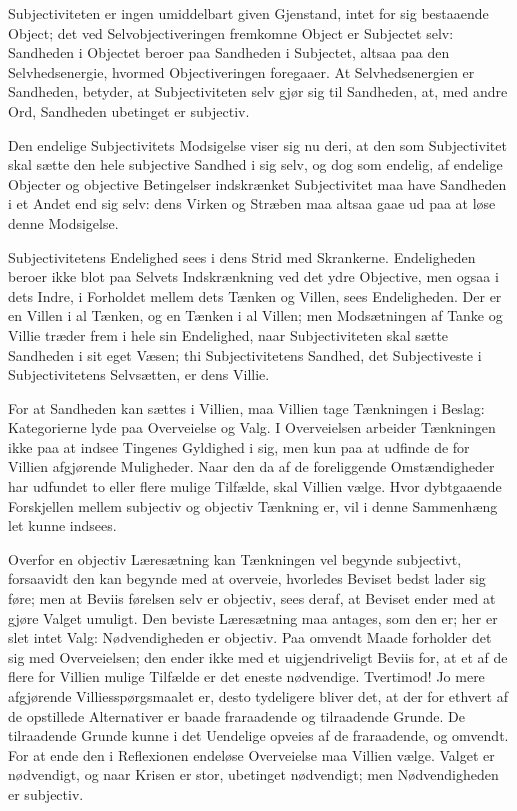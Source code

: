 \documentclass[12pt]{book}
\newcommand{\opage}[1]{\marginnote{\footnotesize\textit{[#1]}}}
\begin{document}
Subjectiviteten er ingen umiddelbart given Gjenstand,
\opage{51} intet for sig bestaaende Object; det ved Selvobjectiveringen
fremkomne Object er Subjectet selv: Sandheden i Objectet beroer paa
Sandheden i Subjectet, altsaa paa den Selvhedsenergie, hvormed
Objectiveringen foregaaer. At Selvhedsenergien er Sandheden,
betyder, at Subjectiviteten selv gjør sig til Sandheden, at, med
andre Ord, Sandheden ubetinget er subjectiv.

Den endelige Subjectivitets Modsigelse viser sig nu deri, at den som
Subjectivitet skal sætte den hele subjective Sandhed i sig selv, og
dog som endelig, af endelige Objecter og objective Betingelser
indskrænket Subjectivitet maa have Sandheden i et Andet end sig
selv: dens Virken og Stræben maa altsaa gaae ud paa at løse denne
Modsigelse.

Subjectivitetens Endelighed sees i dens Strid med Skrankerne.
Endeligheden beroer ikke blot paa Selvets Indskrænkning ved det ydre
Objective, men ogsaa i dets Indre, i Forholdet mellem dets Tænken og
Villen, sees Endeligheden. Der er en Villen i al Tænken, og en
Tænken i al Villen; men Modsætningen af Tanke og Villie træder frem
i hele sin Endelighed, naar Subjectiviteten skal sætte Sandheden i
sit eget Væsen; thi Subjectivitetens Sandhed, det Subjectiveste i
Subjectivitetens Selvsætten, er dens Villie.

For at Sandheden kan sættes i Villien, maa Villien tage Tænkningen i
Beslag: Kategorierne lyde paa Overveielse og Valg. I Overveielsen
arbeider Tænkningen ikke paa at indsee Tingenes Gyldighed i sig, men
kun paa at udfinde de for Villien afgjørende Muligheder. Naar den da
af de foreliggende Omstændigheder har udfundet to eller flere mulige
Tilfælde, skal Villien vælge. Hvor dybtgaaende Forskjellen mellem
subjectiv og objectiv Tænkning er, vil i denne Sammenhæng let kunne
indsees.

Overfor en objectiv Læresætning kan Tænkningen vel begynde
subjectivt, forsaavidt den kan begynde med at overveie, hvorledes
Beviset bedst lader sig føre; men at Beviis%
\opage{52}førelsen selv er objectiv, sees deraf, at Beviset ender med at gjøre
Valget umuligt. Den beviste Læresætning maa antages, som den er; her
er slet intet Valg: Nødvendigheden er objectiv. Paa omvendt Maade
forholder det sig med Overveielsen; den ender ikke med et
uigjendriveligt Beviis for, at et af de flere for Villien mulige
Tilfælde er det eneste nødvendige. Tvertimod! Jo mere afgjørende
Villiesspørgsmaalet er, desto tydeligere bliver det, at der for
ethvert af de opstillede Alternativer er baade fraraadende og
tilraadende Grunde. De tilraadende Grunde kunne i det Uendelige
opveies af de fraraadende, og omvendt. For at ende den i Reflexionen
endeløse Overveielse maa Villien vælge. Valget er nødvendigt, og
naar Krisen er stor, ubetinget nødvendigt; men Nødvendigheden er
subjectiv.
\end{document}
